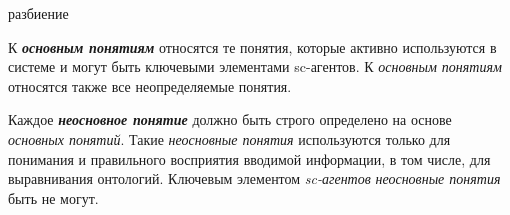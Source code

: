 \begin{SCn}
\begin{scnreltoset}{разбиение}
\end{scnreltoset}




\end{SCn}

К \textbf{\textit{основным понятиям}} относятся те понятия, которые активно используются в системе и могут быть ключевыми элементами sc-агентов. К \textit{основным понятиям} относятся также все неопределяемые понятия.

\begin{SCn}
\end{SCn}

Каждое \textbf{\textit{неосновное понятие}} должно быть строго определено на основе \textit{основных понятий}. Такие \textit{неосновные понятия} используются только для понимания и правильного восприятия вводимой информации, в том числе, для выравнивания онтологий. Ключевым элементом \textit{sc-агентов} \textit{неосновные понятия} быть не могут.

